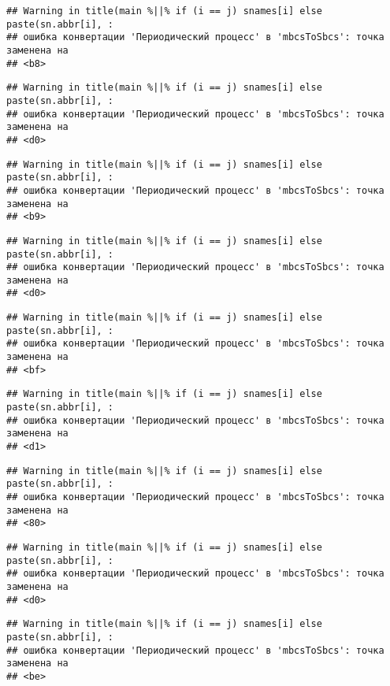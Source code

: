 \documentclass[
]{article}
\begin{document}
\begin{verbatim}
## Warning in title(main %||% if (i == j) snames[i] else paste(sn.abbr[i], :
## ошибка конвертации 'Периодический процесс' в 'mbcsToSbcs': точка заменена на
## <b8>
\end{verbatim}

\begin{verbatim}
## Warning in title(main %||% if (i == j) snames[i] else paste(sn.abbr[i], :
## ошибка конвертации 'Периодический процесс' в 'mbcsToSbcs': точка заменена на
## <d0>
\end{verbatim}

\begin{verbatim}
## Warning in title(main %||% if (i == j) snames[i] else paste(sn.abbr[i], :
## ошибка конвертации 'Периодический процесс' в 'mbcsToSbcs': точка заменена на
## <b9>
\end{verbatim}

\begin{verbatim}
## Warning in title(main %||% if (i == j) snames[i] else paste(sn.abbr[i], :
## ошибка конвертации 'Периодический процесс' в 'mbcsToSbcs': точка заменена на
## <d0>
\end{verbatim}

\begin{verbatim}
## Warning in title(main %||% if (i == j) snames[i] else paste(sn.abbr[i], :
## ошибка конвертации 'Периодический процесс' в 'mbcsToSbcs': точка заменена на
## <bf>
\end{verbatim}

\begin{verbatim}
## Warning in title(main %||% if (i == j) snames[i] else paste(sn.abbr[i], :
## ошибка конвертации 'Периодический процесс' в 'mbcsToSbcs': точка заменена на
## <d1>
\end{verbatim}

\begin{verbatim}
## Warning in title(main %||% if (i == j) snames[i] else paste(sn.abbr[i], :
## ошибка конвертации 'Периодический процесс' в 'mbcsToSbcs': точка заменена на
## <80>
\end{verbatim}

\begin{verbatim}
## Warning in title(main %||% if (i == j) snames[i] else paste(sn.abbr[i], :
## ошибка конвертации 'Периодический процесс' в 'mbcsToSbcs': точка заменена на
## <d0>
\end{verbatim}

\begin{verbatim}
## Warning in title(main %||% if (i == j) snames[i] else paste(sn.abbr[i], :
## ошибка конвертации 'Периодический процесс' в 'mbcsToSbcs': точка заменена на
## <be>
\end{verbatim}
\end{document}
